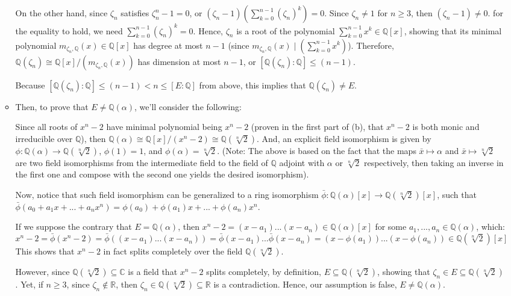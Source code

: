 \documentclass{article}
\begin{document}
\begin{itemize}
\begin{itemize}
        On the other hand, since $\zeta_n$ satisfies $\zeta_n^n-1 = 0$, or $(\zeta_n-1)(\sum_{k=0}^{n-1}(\zeta_n)^k)=0$. Since $\zeta_n\neq 1$ for $n\geq 3$, then $(\zeta_n-1)\neq 0$. for the equality to hold, we need $\sum_{k=0}^{n-1}(\zeta_n)^k=0$.
        Hence, $\zeta_n$ is a root of the polynomial $\sum_{k=0}^{n-1}x^k\in\mathbb{Q}[x]$, showing that its minimal polynomial $m_{\zeta_n,\mathbb{Q}}(x)\in\mathbb{Q}[x]$ has degree at most $n-1$ (since $m_{\zeta_n,\mathbb{Q}}(x)\mid (\sum_{k=0}^{n-1}x^k)$).
        Therefore, $\mathbb{Q}(\zeta_n)\cong \mathbb{Q}[x]/(m_{\zeta_n,\mathbb{Q}}(x))$ has dimension at most $n-1$, or $[\mathbb{Q}(\zeta_n):\mathbb{Q}]\leq (n-1)$.

        Because $[\mathbb{Q}(\zeta_n):\mathbb{Q}]\leq (n-1) < n \leq [E:\mathbb{Q}]$ from above, this implies that $\mathbb{Q}(\zeta_n)\neq E$.

        \item Then, to prove that $E\neq \mathbb{Q}(\alpha)$, we'll consider the following:
        
        Since all roots of $x^n-2$ have minimal polynomial being $x^n-2$ (proven in the first part of (b), that $x^n-2$ is both monic and irreducible over $\mathbb{Q}$), then $\mathbb{Q}(\alpha)\cong \mathbb{Q}[x]/(x^n-2)\cong \mathbb{Q}(\sqrt[n]{2})$. And, an explicit field isomorphism is given by $\phi:\mathbb{Q}(\alpha)\rightarrow\mathbb{Q}(\sqrt[n]{2})$, $\phi(1)=1$, and $\phi(\alpha)=\sqrt[n]{2}$.
        (Note: The above is based on the fact that the maps $\bar{x}\mapsto \alpha$ and $\bar{x}\mapsto \sqrt[n]{2}$ are two field isomorphisms from the intermediate field to the field of $\mathbb{Q}$ adjoint with $\alpha$ or $\sqrt[n]{2}$ respectively, then taking an inverse in the first one and compose with the second one yields the desired isomorphism).

        Now, notice that such field isomorphism can be generalized to a ring isomorphism $\bar{\phi}:\mathbb{Q}(\alpha)[x]\rightarrow \mathbb{Q}(\sqrt[n]{2})[x]$, such that $\bar{\phi}(a_0+a_1x+...+a_nx^n) = \phi(a_0)+\phi(a_1)x+...+\phi(a_n)x^n$.

        If we suppose the contrary that $E=\mathbb{Q}(\alpha)$, then $x^n-2 = (x-a_1)...(x-a_n)\in \mathbb{Q}(\alpha)[x]$ for some $a_1,...,a_n\in\mathbb{Q}(\alpha)$, which:
        $$x^n-2=\bar{\phi}(x^n-2) = \bar{\phi}((x-a_1)...(x-a_n))=\bar{\phi}(x-a_1)...\bar{\phi}(x-a_n) = (x-\phi(a_1))...(x-\phi(a_n))\in\mathbb{Q}(\sqrt[n]{2})[x]$$
        This shows that $x^n-2$ in fact splits completely over the field $\mathbb{Q}(\sqrt[n]{2})$.

        However, since $\mathbb{Q}(\sqrt[n]{2})\subseteq\mathbb{C}$ is a field that $x^n-2$ splits completely, by definition, $E\subseteq \mathbb{Q}(\sqrt[n]{2})$, showing that $\zeta_n\in E\subseteq \mathbb{Q}(\sqrt[n]{2})$.
        Yet, if $n\geq 3$, since $\zeta_n\notin \mathbb{R}$, then $\zeta_n\in\mathbb{Q}(\sqrt[n]{2})\subseteq\mathbb{R}$ is a contradiction.
        Hence, our assumption is false, $E\neq \mathbb{Q}(\alpha)$.
    \end{itemize}
\end{itemize}
\end{document}
